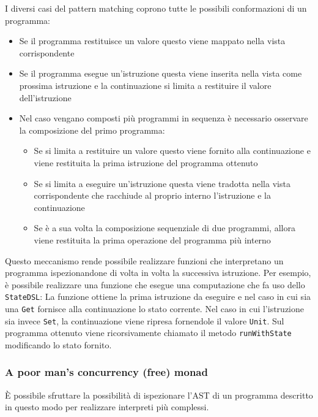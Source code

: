 I diversi casi del pattern matching coprono tutte le possibili conformazioni di un programma:
\begin{itemize}
  \item Se il programma restituisce un valore questo viene mappato nella vista corrispondente
  \item Se il programma esegue un'istruzione questa viene inserita nella vista come prossima istruzione e la continuazione si limita a restituire il valore dell'istruzione
  \item Nel caso vengano composti più programmi in sequenza è necessario osservare la composizione del primo programma:
        \begin{itemize}
          \item Se si limita a restituire un valore questo viene fornito alla continuazione e viene restituita la prima istruzione del programma ottenuto
          \item Se si limita a eseguire un'istruzione questa viene tradotta nella vista corrispondente che racchiude al proprio interno l'istruzione e la continuazione
          \item Se è a sua volta la composizione sequenziale di due programmi, allora viene restituita la prima operazione del programma più interno
        \end{itemize}
\end{itemize}

Questo meccanismo rende possibile realizzare funzioni che interpretano un programma ispezionandone di volta in volta la successiva istruzione. Per esempio, è possibile realizzare una funzione che esegue una computazione che fa uso dello \lstinline{StateDSL}:
La funzione ottiene la prima istruzione da eseguire e nel caso in cui sia una \lstinline{Get} fornisce alla continuazione lo stato corrente. Nel caso in cui l'istruzione sia invece \lstinline{Set}, la continuazione viene ripresa fornendole il valore \lstinline{Unit}. Sul programma ottenuto viene ricorsivamente chiamato il metodo \lstinline{runWithState} modificando lo stato fornito.

\subsubsection{A poor man’s concurrency (free) monad}
\label{sec:poor-man}
È possibile sfruttare la possibilità di ispezionare l'AST di un programma descritto in questo modo per realizzare interpreti più complessi.

